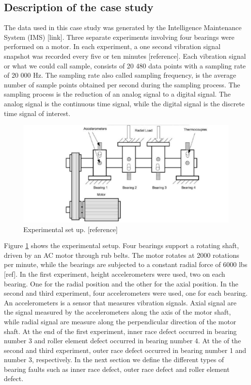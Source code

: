 \documentclass[../Main/thesis.tex]{subfiles}
\begin{document}
\subsection{Description of the case study}
The data used in this case study was generated by the Intelligence Maintenance System (IMS) [link]. Three separate experiments involving four bearings were performed on a motor. In each experiment, a one second vibration signal snapshot was recorded every five or ten minutes [reference]. Each vibration signal or what we could call sample, consists of 20 480 data points with a sampling rate of 20 000 Hz.
\justify
The sampling rate also called sampling frequency, is the average number of sample points obtained per second during the sampling process. The sampling process is the reduction of an analog signal to a digital signal. The analog signal is the continuous time signal, while the digital signal is the discrete time signal of interest.
\begin{figure}[H] %
   \centering
   \includegraphics[width=8in]{../fig/experiment} 
   \caption{Experimental set up. [reference]}
   \label{fig:exp}
\end{figure}
\justify
Figure \ref{fig:exp} shows the experimental setup. Four bearings support a rotating shaft, driven by an AC motor through rub belts. The motor rotates at 2000 rotations per minute, while the bearings are subjected to a constant radial force of 6000 lbs [ref]. In the first experiment, height accelerometers were used, two on each bearing. One for the radial position and the other for the axial position. In the second and third experiment, four accelerometers were used, one for each bearing.
\justify
An accelerometers is a sensor that measures vibration signals. Axial signal are the signal measured by the accelerometers along the axis of the motor shaft, while radial signal are measure along the perpendicular direction of the motor shaft.
\justify
At the end of the first experiment, inner race defect occurred in bearing number 3 and roller element defect occurred in bearing number 4. At the of the second and third experiment, outer race defect occurred in bearing number 1 and number 3, respectively. In the next section we define the different types of bearing faults such as inner race defect, outer race defect and roller element defect. 
\end{document}
